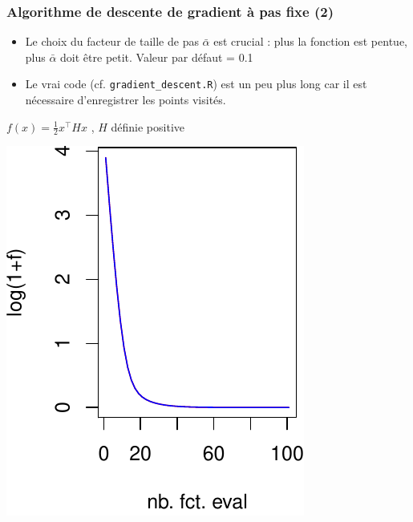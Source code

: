\documentclass[12pt]{beamer}
\begin{document}
\begin{frame}
\frametitle{Algorithme de descente de gradient à pas fixe (2)} 
\begin{itemize}
\item Le choix du facteur de taille de pas $\bar\alpha$ est crucial : plus la fonction est pentue, plus $\bar\alpha$ doit être petit. Valeur par défaut = 0.1
\item Le vrai code (cf. \texttt{gradient\_descent.R}) est un peu plus long car il est nécessaire d’enregistrer les points visités.
\end{itemize}
\vspace{-0.5cm}
\begin{center}
{\scriptsize $f(x) = \frac{1}{2} x^\top H x$ , $H$ définie positive}\\
\begin{minipage}[b]{0.3\textwidth}
\includegraphics[width=\textwidth]{gradient_quad_2d_f_alpha01-crop.pdf} 
\end{minipage}
\hspace{1.5cm}
\begin{minipage}[b]{0.3\textwidth}

\end{minipage}
\end{center}
\end{frame}
\end{document}
